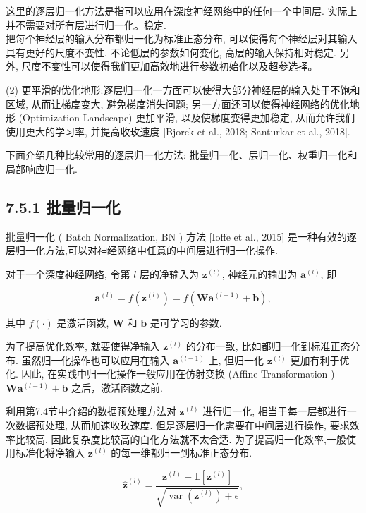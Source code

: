 \documentclass[10pt]{article}
\begin{document}
这里的逐层归一化方法是指可以应用在深度神经网络中的任何一个中间层. 实际上并不需要对所有层进行归一化。稳定.\\
把每个神经层的输入分布都归一化为标准正态分布, 可以使得每个神经层对其输入具有更好的尺度不变性. 不论低层的参数如何变化, 高层的输入保持相对稳定. 另外, 尺度不变性可以使得我们更加高效地进行参数初始化以及超参选择。

(2) 更平滑的优化地形:逐层归一化一方面可以使得大部分神经层的输入处于不饱和区域, 从而让梯度变大, 避免梯度消失问题; 另一方面还可以使得神经网络的优化地形 (Optimization Landscape) 更加平滑, 以及使梯度变得更加稳定, 从而允许我们使用更大的学习率, 并提高收玫速度 [Bjorck et al., 2018; Santurkar et al., 2018].

下面介绍几种比较常用的逐层归一化方法: 批量归一化、层归一化、权重归一化和局部响应归一化.

\subsection*{7.5.1 批量归一化}
批量归一化 ( Batch Normalization, BN ) 方法 [Ioffe et al., 2015] 是一种有效的逐层归一化方法,可以对神经网络中任意的中间层进行归一化操作.

对于一个深度神经网络, 令第 $l$ 层的净输入为 $\boldsymbol{z}^{(l)}$, 神经元的输出为 $\boldsymbol{a}^{(l)}$, 即


\begin{equation*}
\boldsymbol{a}^{(l)}=f\left(\boldsymbol{z}^{(l)}\right)=f\left(\boldsymbol{W} \boldsymbol{a}^{(l-1)}+\boldsymbol{b}\right), \tag{7.51}
\end{equation*}


其中 $f(\cdot)$ 是激活函数, $\boldsymbol{W}$ 和 $\boldsymbol{b}$ 是可学习的参数.

为了提高优化效率, 就要使得净输入 $\boldsymbol{z}^{(l)}$ 的分布一致, 比如都归一化到标准正态分布. 虽然归一化操作也可以应用在输入 $\boldsymbol{a}^{(l-1)}$ 上, 但归一化 $\boldsymbol{z}^{(l)}$ 更加有利于优化. 因此, 在实践中归一化操作一般应用在仿射变换 (Affine Transformation ) $\boldsymbol{W} \boldsymbol{a}^{(l-1)}+\boldsymbol{b}$ 之后，激活函数之前.

利用第7.4节中介绍的数据预处理方法对 $\boldsymbol{z}^{(l)}$ 进行归一化, 相当于每一层都进行一次数据预处理, 从而加速收玫速度. 但是逐层归一化需要在中间层进行操作, 要求效率比较高, 因此复杂度比较高的白化方法就不太合适. 为了提高归一化效率,一般使用标准化将净输入 $\boldsymbol{z}^{(l)}$ 的每一维都归一到标准正态分布.


\begin{equation*}
\hat{\boldsymbol{z}}^{(l)}=\frac{\boldsymbol{z}^{(l)}-\mathbb{E}\left[\boldsymbol{z}^{(l)}\right]}{\sqrt{\operatorname{var}\left(\boldsymbol{z}^{(l)}\right)+\epsilon}}, \tag{7.52}
\end{equation*}
\end{document}

